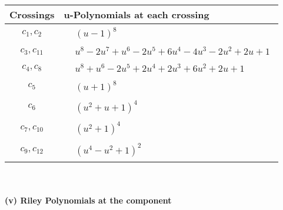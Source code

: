 \documentclass[1p]{elsarticle_modified}
\theoremstyle{definition}
\begin{document}
\begin{tabular}{m{50pt}|m{274pt}}
Crossings & \hspace{64pt}u-Polynomials at each crossing \\
\hline $$\begin{aligned}c_{1},c_{2}\end{aligned}$$&$\begin{aligned}
&(u-1)^8
\end{aligned}$\\
\hline $$\begin{aligned}c_{3},c_{11}\end{aligned}$$&$\begin{aligned}
&u^8-2 u^7+u^6-2 u^5+6 u^4-4 u^3-2 u^2+2 u+1
\end{aligned}$\\
\hline $$\begin{aligned}c_{4},c_{8}\end{aligned}$$&$\begin{aligned}
&u^8+u^6-2 u^5+2 u^4+2 u^3+6 u^2+2 u+1
\end{aligned}$\\
\hline $$\begin{aligned}c_{5}\end{aligned}$$&$\begin{aligned}
&(u+1)^8
\end{aligned}$\\
\hline $$\begin{aligned}c_{6}\end{aligned}$$&$\begin{aligned}
&(u^2+u+1)^4
\end{aligned}$\\
\hline $$\begin{aligned}c_{7},c_{10}\end{aligned}$$&$\begin{aligned}
&(u^2+1)^4
\end{aligned}$\\
\hline $$\begin{aligned}c_{9},c_{12}\end{aligned}$$&$\begin{aligned}
&(u^4- u^2+1)^2
\end{aligned}$\\
\hline
\end{tabular}\\~\\
\newpage\renewcommand{\arraystretch}{1}
\flushleft \textbf{(v) Riley Polynomials at the component}\newline \\
\end{document}
